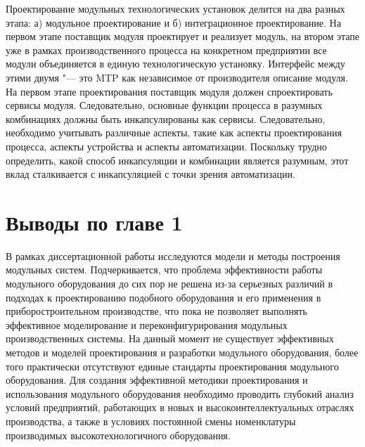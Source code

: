 Проектирование модульных технологических установок делится на два разных этапа: а) модульное проектирование и б) интеграционное проектирование. На первом этапе поставщик модуля проектирует и реализует модуль, на втором этапе уже в рамках производственного процесса на конкретном предприятии все модули объединяется в единую технологическую установку. Интерфейс между этими двумя "--- это MTP как независимое от производителя описание модуля. На первом этапе проектирования поставщик модуля должен спроектировать сервисы модуля. Следовательно, основные функции процесса в разумных комбинациях должны быть инкапсулированы как сервисы. Следовательно, необходимо учитывать различные аспекты, такие как аспекты проектирования процесса, аспекты устройства и аспекты автоматизации. Поскольку трудно определить, какой способ инкапсуляции и комбинации является разумным, этот вклад сталкивается с инкапсуляцией с точки зрения автоматизации.

\section{Выводы по главе 1}

В рамках диссертационной работы исследуются модели и методы построения модульных систем. Подчеркивается, что проблема эффективности работы модульного оборудования до сих пор не решена из-за серьезных различий в подходах к проектированию подобного оборудования и его применения в приборостроительном производстве, что пока не позволяет выполнять эффективное моделирование и переконфигурирования модульных производственных системы. На данный момент не существует эффективных методов и моделей проектирования и разработки модульного оборудования, более того практически отсутствуют единые стандарты проектирования модульного оборудования. Для создания эффективной методики проектирования и использования модульного оборудования необходимо проводить глубокий анализ условий предприятий, работающих в новых и высокоинтеллектуальных отраслях производства, а также в условиях постоянной смены номенклатуры производимых высокотехнологичного оборудования.

\FloatBarrier

